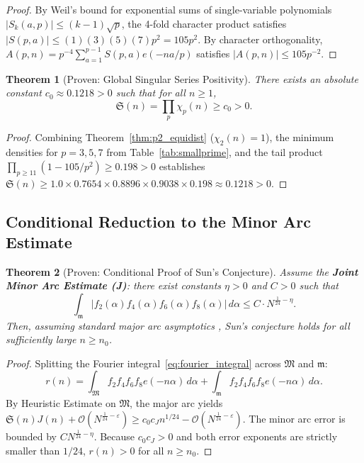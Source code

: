 \documentclass[11pt, a4paper]{article}
\theoremstyle{plain}
\newtheorem{theorem}{Theorem}[section]
\theoremstyle{definition}
\begin{document}
\begin{proof}
By Weil's bound for exponential sums of single-variable polynomials $|S_k(a, p)| \leq (k-1)\sqrt{p}$, the 4-fold character product satisfies $|S(p,a)| \leq (1)(3)(5)(7) p^2 = 105 p^2$. By character orthogonality, $A(p,n) = p^{-4} \sum_{a=1}^{p-1} S(p,a) e(-na/p)$ satisfies $|A(p,n)| \leq 105 p^{-2}$.
\end{proof}

\begin{theorem}[Proven: Global Singular Series Positivity]\label{thm:sing_pos}
There exists an absolute constant $c_0 \approx 0.1218 > 0$ such that for all $n \geq 1$,
\begin{equation}
\mathfrak{S}(n) = \prod_p \chi_p(n) \geq c_0 > 0.
\end{equation}
\end{theorem}

\begin{proof}
Combining Theorem~\ref{thm:p2_equidist} ($\chi_2(n)=1$), the minimum densities for $p=3,5,7$ from Table~\ref{tab:smallprime}, and the tail product $\prod_{p \ge 11} (1 - 105/p^2) \ge 0.198 > 0$ establishes $\mathfrak{S}(n) \ge 1.0 \times 0.7654 \times 0.8896 \times 0.9038 \times 0.198 \approx 0.1218 > 0$.
\end{proof}

\subsection{Conditional Reduction to the Minor Arc Estimate}

\begin{theorem}[Proven: Conditional Proof of Sun's Conjecture]\label{thm:conditional}
Assume the \textbf{Joint Minor Arc Estimate (J)}: there exist constants $\eta > 0$ and $C > 0$ such that
\begin{equation}\label{eq:joint_minor_est}
\int_{\mathfrak{m}} |f_2(\alpha) f_4(\alpha) f_6(\alpha) f_8(\alpha)|\,d\alpha \leq C \cdot N^{\frac{1}{24} - \eta}.
\end{equation}
Then, assuming standard major arc asymptotics \cite{scottsun2026v2}, Sun's conjecture holds for all sufficiently large $n \geq n_0$.
\end{theorem}

\begin{proof}
Splitting the Fourier integral~\eqref{eq:fourier_integral} across $\mathfrak{M}$ and $\mathfrak{m}$:
\[
r(n) = \int_{\mathfrak{M}} f_2 f_4 f_6 f_8 e(-n\alpha)\,d\alpha + \int_{\mathfrak{m}} f_2 f_4 f_6 f_8 e(-n\alpha)\,d\alpha.
\]
By Heuristic Estimate on $\mathfrak{M}$, the major arc yields $\mathfrak{S}(n) J(n) + \mathcal{O}(N^{\frac{1}{24}-\varepsilon}) \ge c_0 c_J n^{1/24} - \mathcal{O}(N^{\frac{1}{24}-\varepsilon})$. The minor arc error is bounded by $C N^{\frac{1}{24}-\eta}$. Because $c_0 c_J > 0$ and both error exponents are strictly smaller than $1/24$, $r(n) > 0$ for all $n \ge n_0$.
\end{proof}
\end{document}
